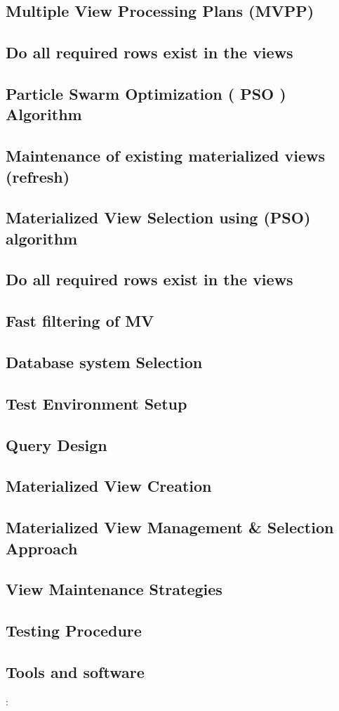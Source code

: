 \subsection{Multiple View Processing Plans (MVPP) }
\subsection{Do all required rows exist in the views }
\subsection{Particle Swarm Optimization ( PSO ) Algorithm
 }
\subsection{Maintenance of existing materialized views (refresh)
}
\subsection{Materialized View Selection using (PSO) algorithm }
\subsection{Do all required rows exist in the views }
\subsection{Fast filtering of MV}

\subsection{Database system Selection}
\subsection{Test Environment Setup }
\subsection{Query Design}
\subsection{Materialized View Creation} 
\subsection{Materialized View Management \& Selection Approach}
\subsection{View Maintenance Strategies}
\subsection{Testing Procedure}
\subsection{Tools and software}: 
